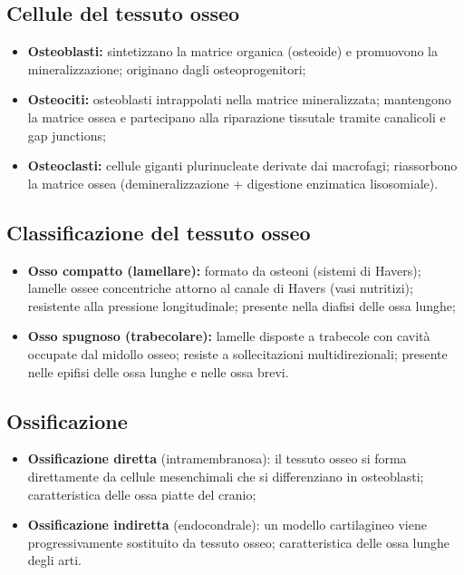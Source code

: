 \documentclass[11pt,a4paper,openright,twoside]{book}
\theoremstyle{definition}
\theoremstyle{plain}
\theoremstyle{remark}
\begin{document}
\subsection{Cellule del tessuto osseo}

\begin{itemize}
  \item \textbf{Osteoblasti:} sintetizzano la matrice organica (osteoide) e promuovono la mineralizzazione; originano dagli osteoprogenitori;
  \item \textbf{Osteociti:} osteoblasti intrappolati nella matrice mineralizzata; mantengono la matrice ossea e partecipano alla riparazione tissutale tramite canalicoli e gap junctions;
  \item \textbf{Osteoclasti:} cellule giganti plurinucleate derivate dai macrofagi; riassorbono la matrice ossea (demineralizzazione + digestione enzimatica lisosomiale).
\end{itemize}

\subsection{Classificazione del tessuto osseo}

\begin{itemize}
  \item \textbf{Osso compatto (lamellare):} formato da osteoni (sistemi di Havers); lamelle ossee concentriche attorno al canale di Havers (vasi nutritizi); resistente alla pressione longitudinale; presente nella diafisi delle ossa lunghe;
  \item \textbf{Osso spugnoso (trabecolare):} lamelle disposte a trabecole con cavità occupate dal midollo osseo; resiste a sollecitazioni multidirezionali; presente nelle epifisi delle ossa lunghe e nelle ossa brevi.
\end{itemize}

\subsection{Ossificazione}

\begin{itemize}
  \item \textbf{Ossificazione diretta} (intramembranosa): il tessuto osseo si forma direttamente da cellule mesenchimali che si differenziano in osteoblasti; caratteristica delle ossa piatte del cranio;
  \item \textbf{Ossificazione indiretta} (endocondrale): un modello cartilagineo viene progressivamente sostituito da tessuto osseo; caratteristica delle ossa lunghe degli arti.
\end{itemize}
\end{document}
